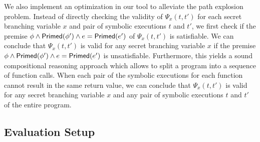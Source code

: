 We also implement an optimization in our tool to alleviate the path explosion problem. Instead of directly checking the validity of $\Psi_x(t,t')$
for each secret branching variable $x$ and pair of symbolic executions $t$ and $t'$,
we first check if the premise $\phi\wedge {\sf Primed}(\phi')\wedge e={\sf Primed}(e')$
of $\Psi_x(t,t')$ is satisfiable. We can conclude that $\Psi_x(t,t')$ is valid for any secret branching variable $x$ if the premise $\phi\wedge {\sf Primed}(\phi')\wedge e={\sf Primed}(e')$ is unsatisfiable.
Furthermore, this yields a sound compositional reasoning approach which allows to split
a program into a sequence of function calls. When each pair of the symbolic executions
for each function cannot result in the same return value, we can conclude that
$\Psi_x(t,t')$ is valid for any secret branching variable $x$ and any pair of symbolic executions $t$ and $t'$
of the entire program.


%

\subsection{Evaluation Setup}\label{sec:experiments}


